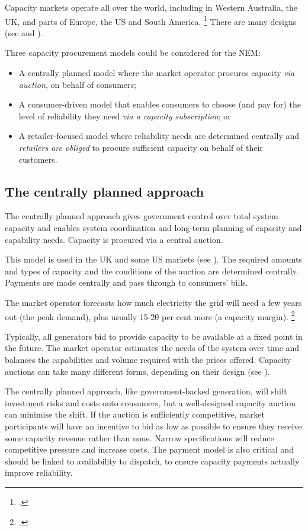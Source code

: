 \documentclass[FrontPage]{grattan}
\begin{document}
Capacity markets operate all over the world, including in Western Australia, the UK, and parts of Europe, the US and South America.%
\footcite{bhagwat2016expertsurvey}
There are many designs (see  and ).

Three capacity procurement models could be considered for the NEM:
\begin{itemize}
    \item A centrally planned model where the market operator procures capacity \emph{via auction}, on behalf of consumers;
    \item A consumer-driven model that enables consumers to choose (and pay for) the level of reliability they need \emph{via a capacity subscription}; or
    \item A retailer-focused model where reliability needs are determined centrally and \emph{retailers are obliged} to procure sufficient capacity on behalf of their customers.
\end{itemize}


\subsection{The centrally planned approach}\label{subsec:the-centrally-planned-approach}
The centrally planned approach gives government control over total system capacity and enables system coordination and long-term planning of capacity and capability needs. Capacity is procured via a central auction.

This model is used in the UK and some US markets (see ). The required amounts and types of capacity and the conditions of the auction are determined centrally. Payments are made centrally and pass through to consumers' bills.

The market operator forecasts how much electricity the grid will need a few years out (the peak demand), plus usually 15-20 per cent more (a capacity margin).%
\footcite{bowring2013capacity}

Typically, all generators bid to provide capacity to be available at a fixed point in the future. The market operator estimates the needs of the system over time and balances the capabilities and volume required with the prices offered. Capacity auctions can take many different forms, depending on their design (see ).

The centrally planned approach, like government-backed generation, will shift investment risks and costs onto consumers, but a well-designed capacity auction can minimise the shift. If the auction is sufficiently competitive, market participants will have an incentive to bid as low as possible to ensure they receive some capacity revenue rather than none. Narrow specifications will reduce competitive pressure and increase costs. The payment model is also critical and should be linked to availability to dispatch, to ensure capacity payments actually improve reliability.
\end{document}
